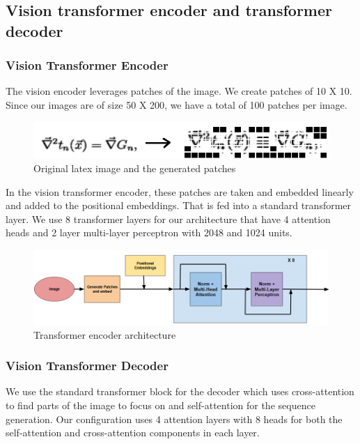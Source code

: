 \documentclass{article}
\begin{document}
\subsection{Vision transformer encoder and transformer decoder}

\subsubsection{Vision Transformer Encoder}
The vision encoder leverages patches of the image. We create patches of 10 X 10. Since our images are of size 50 X 200, we have a total of 100 patches per image.
\begin{figure}[h]
	\centering \includegraphics[scale=0.3]{image_to_patches.png}
	\caption{Original latex image and the generated patches}
\end{figure}

In the vision transformer encoder, these patches are taken and embedded linearly and added to the positional embeddings. That is fed into a standard transformer layer. We use 8 transformer layers for our architecture that have 4 attention heads and 2 layer multi-layer perceptron with 2048 and 1024 units.

\begin{figure}[H]
	\centering \includegraphics[scale=0.5]{transformer_encoder.png}
	\caption{Transformer encoder architecture}
\end{figure}

\subsubsection{Vision Transformer Decoder}

We use the standard transformer block for the decoder which uses cross-attention to find parts of the image to focus on and self-attention for the sequence generation. Our configuration uses 4 attention layers with 8 heads for both the self-attention and cross-attention components in each layer.
\end{document}
